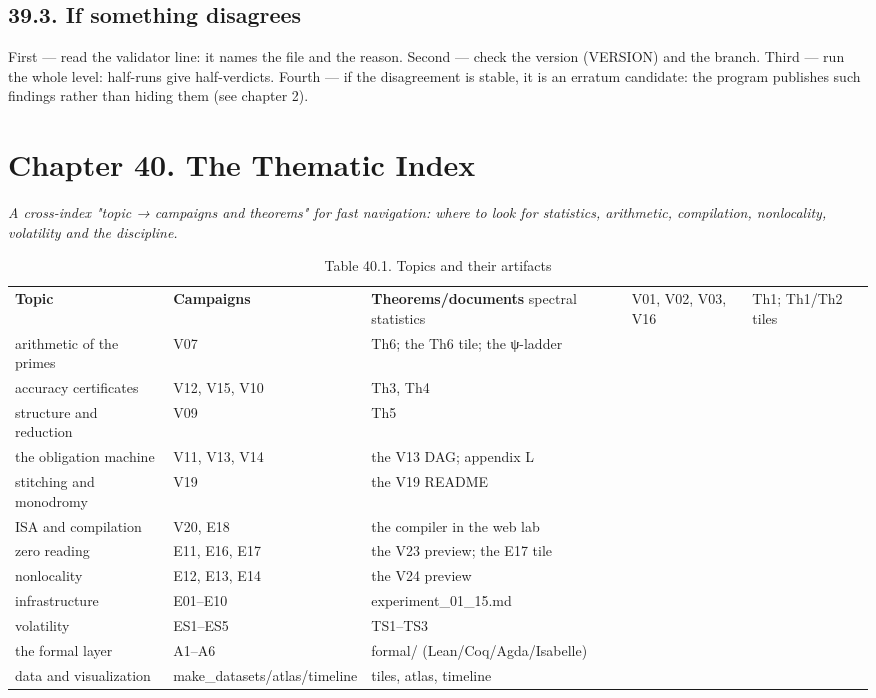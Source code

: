 \documentclass[11pt,a4paper]{article}
\begin{document}
\begin{center}\end{center}

\subsection{39.3. If something disagrees}

First — read the validator line: it names the file and the reason. Second — check the version (VERSION) and the branch. Third — run the whole level: half-runs give half-verdicts. Fourth — if the disagreement is stable, it is an erratum candidate: the program publishes such findings rather than hiding them (see chapter 2).

\section{Chapter 40. The Thematic Index}

\noindent\textit{\color{copper}A cross-index "topic → campaigns and theorems" for fast navigation: where to look for statistics, arithmetic, compilation, nonlocality, volatility and the discipline.}

\begin{table}[htbp]\centering\small
\caption{Table 40.1. Topics and their artifacts}
\begin{tabular}{p{} p{} p{}}
\toprule
\textbf{Topic} & \textbf{Campaigns} & \textbf{Theorems/documents}
\midrule
spectral statistics & V01, V02, V03, V16 & Th1; Th1/Th2 tiles \\
arithmetic of the primes & V07 & Th6; the Th6 tile; the ψ-ladder \\
accuracy certificates & V12, V15, V10 & Th3, Th4 \\
structure and reduction & V09 & Th5 \\
the obligation machine & V11, V13, V14 & the V13 DAG; appendix L \\
stitching and monodromy & V19 & the V19 README \\
ISA and compilation & V20, E18 & the compiler in the web lab \\
zero reading & E11, E16, E17 & the V23 preview; the E17 tile \\
nonlocality & E12, E13, E14 & the V24 preview \\
infrastructure & E01–E10 & experiment\_01\_15.md \\
volatility & ES1–ES5 & TS1–TS3 \\
the formal layer & A1–A6 & formal/ (Lean/Coq/Agda/Isabelle) \\
data and visualization & make\_datasets/atlas/timeline & tiles, atlas, timeline \\
\bottomrule
\end{tabular}
\end{table}
\end{document}
